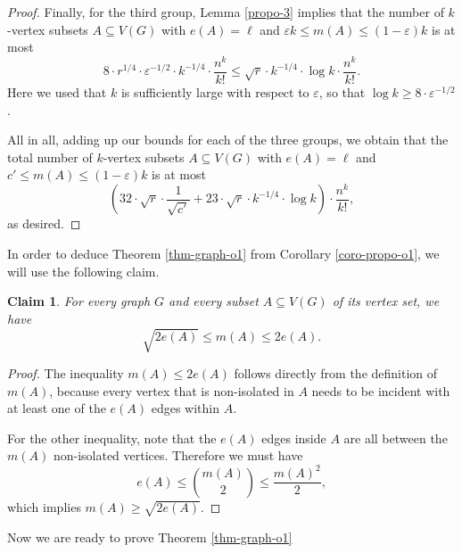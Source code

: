 \documentclass[11pt]{article}
\newtheorem{claim}[theorem]{Claim}
\theoremstyle{definition}
\numberwithin{equation}{section}
\begin{document}
\begin{proof}
Finally, for the third group, Lemma \ref{propo-3} implies that the number of $k$-vertex subsets $A\subseteq V(G)$ with $e(A)=\ell$ and $\varepsilon k\leq m(A)\leq (1-\varepsilon)k$ is at most
\[8\cdot r^{1/4}\cdot \varepsilon^{-1/2}\cdot k^{-1/4}\cdot \frac{n^k}{k!}\leq \sqrt{r}\cdot k^{-1/4}\cdot \log k\cdot \frac{n^k}{k!}.\]
Here we used that $k$ is sufficiently large with respect to $\varepsilon$, so that $\log k\geq 8\cdot \varepsilon^{-1/2}$.

All in all, adding up our bounds for each of the three groups, we obtain that the total number of $k$-vertex subsets $A\subseteq V(G)$ with $e(A)=\ell$ and $c' \leq m(A)\leq (1-\varepsilon) k$ is at most
\[\left(32\cdot \sqrt{r}\cdot \frac{1}{\sqrt{c'}}+23 \cdot \sqrt{r}\cdot k^{-1/4}\cdot \log k\right)\cdot \frac{n^k}{k!},\]
as desired.
\end{proof}

In order to deduce Theorem \ref{thm-graph-o1} from Corollary \ref{coro-propo-o1}, we will use the following claim.

\begin{claim}\label{claim-mA-bounds-graph} For every graph $G$ and every subset $A\subseteq V(G)$ of its vertex set, we have
\[\sqrt{2e(A)}\leq m(A)\leq 2e(A).\]
\end{claim}
\begin{proof}The inequality $m(A)\leq 2e(A)$ follows directly from the definition of $m(A)$, because every vertex that is non-isolated in $A$ needs to be incident with at least one of the $e(A)$ edges within $A$.

For the other inequality, note that the $e(A)$ edges inside $A$ are all between the $m(A)$ non-isolated vertices. Therefore we must have
\[e(A)\leq {m(A) \choose 2}\leq \frac{m(A)^2}{2},\]
which implies $m(A)\geq \sqrt{2e(A)}$.
\end{proof}

Now we are ready to prove Theorem \ref{thm-graph-o1}
\end{document}
